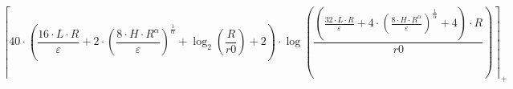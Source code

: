\[\left\lceil 40 \cdot \left(\frac{16 \cdot L \cdot R}{\varepsilon} + 2 \cdot \left(\frac{8 \cdot H \cdot R^{\alpha}}{\varepsilon}\right)^{\frac{1}{\alpha}} + \log_{2}\left(\frac{R}{r0}\right) + 2\right) \cdot \log\left(\frac{\left(\frac{32 \cdot L \cdot R}{\varepsilon} + 4 \cdot \left(\frac{8 \cdot H \cdot R^{\alpha}}{\varepsilon}\right)^{\frac{1}{\alpha}} + 4\right) \cdot R}{r0}\right) \right\rceil_{+}\]
